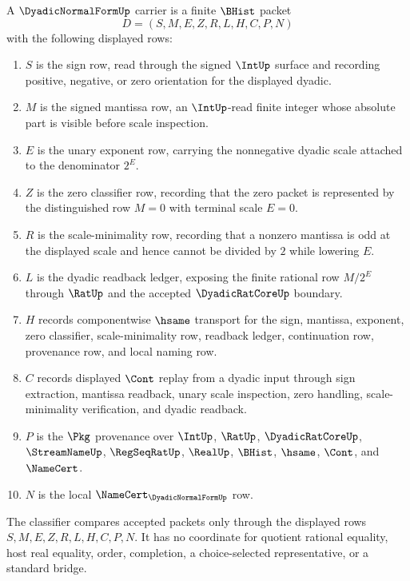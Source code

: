 \begin{definition}
\label{def:dyadic-normal-form-carrier}
A $\DyadicNormalFormUp$ carrier is a finite $\BHist$ packet
$$
D=(S,M,E,Z,R,L,H,C,P,N)
$$
with the following displayed rows:
\begin{enumerate}
\item $S$ is the sign row, read through the signed $\IntUp$ surface and recording positive, negative, or zero orientation for the displayed dyadic.
\item $M$ is the signed mantissa row, an $\IntUp$-read finite integer whose absolute part is visible before scale inspection.
\item $E$ is the unary exponent row, carrying the nonnegative dyadic scale attached to the denominator $2^E$.
\item $Z$ is the zero classifier row, recording that the zero packet is represented by the distinguished row $M=0$ with terminal scale $E=0$.
\item $R$ is the scale-minimality row, recording that a nonzero mantissa is odd at the displayed scale and hence cannot be divided by $2$ while lowering $E$.
\item $L$ is the dyadic readback ledger, exposing the finite rational row $M/2^E$ through $\RatUp$ and the accepted $\DyadicRatCoreUp$ boundary.
\item $H$ records componentwise $\hsame$ transport for the sign, mantissa, exponent, zero classifier, scale-minimality row, readback ledger, continuation row, provenance row, and local naming row.
\item $C$ records displayed $\Cont$ replay from a dyadic input through sign extraction, mantissa readback, unary scale inspection, zero handling, scale-minimality verification, and dyadic readback.
\item $P$ is the $\Pkg$ provenance over $\IntUp$, $\RatUp$, $\DyadicRatCoreUp$, $\StreamNameUp$, $\RegSeqRatUp$, $\RealUp$, $\BHist$, $\hsame$, $\Cont$, and $\NameCert$.
\item $N$ is the local $\NameCert_{\DyadicNormalFormUp}$ row.
\end{enumerate}
The classifier compares accepted packets only through the displayed rows $S,M,E,Z,R,L,H,C,P,N$. It has no coordinate for quotient rational equality, host real equality, order, completion, a choice-selected representative, or a standard bridge.
\end{definition}

